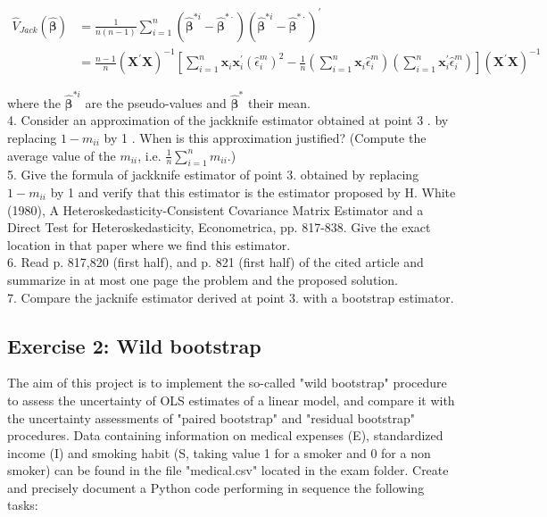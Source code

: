 $$
\begin{aligned}
\hat{V}_{J a c k}(\hat{\boldsymbol{\beta}}) & =\frac{1}{n(n-1)} \sum_{i=1}^{n}\left(\hat{\boldsymbol{\beta}}^{* i}-\hat{\boldsymbol{\beta}}^{* \cdot}\right)\left(\hat{\boldsymbol{\beta}}^{* i}-\hat{\boldsymbol{\beta}}^{* \cdot}\right)^{\prime} \\
& =\frac{n-1}{n}\left(\mathbf{X}^{\prime} \mathbf{X}\right)^{-1}\left[\sum_{i=1}^{n} \mathbf{x}_{i} \mathbf{x}_{i}^{\prime}\left(\hat{\epsilon}_{i}^{m}\right)^{2}-\frac{1}{n}\left(\sum_{i=1}^{n} \mathbf{x}_{i} \hat{\epsilon}_{i}^{m}\right)\left(\sum_{i=1}^{n} \mathbf{x}_{i}^{\prime} \hat{\epsilon}_{i}^{m}\right)\right]\left(\mathbf{X}^{\prime} \mathbf{X}\right)^{-1}
\end{aligned}
$$

where the $\hat{\boldsymbol{\beta}}^{* i}$ are the pseudo-values and $\hat{\boldsymbol{\beta}}^{*}$ their mean.\\
4. Consider an approximation of the jackknife estimator obtained at point 3 . by replacing $1-m_{i i}$ by 1 . When is this approximation justified? (Compute the average value of the $m_{i i}$, i.e. $\frac{1}{n} \sum_{i=1}^{n} m_{i i}$.)\\
5. Give the formula of jackknife estimator of point 3. obtained by replacing $1-m_{i i}$ by 1 and verify that this estimator is the estimator proposed by H. White (1980), A Heteroskedasticity-Consistent Covariance Matrix Estimator and a Direct Test for Heteroskedasticity, Econometrica, pp. 817-838. Give the exact location in that paper where we find this estimator.\\
6. Read p. 817,820 (first half), and p. 821 (first half) of the cited article and summarize in at most one page the problem and the proposed solution.\\
7. Compare the jacknife estimator derived at point 3. with a bootstrap estimator.

\subsection{Exercise 2: Wild bootstrap}
The aim of this project is to implement the so-called "wild bootstrap" procedure to assess the uncertainty of OLS estimates of a linear model, and compare it with the uncertainty assessments of "paired bootstrap" and "residual bootstrap" procedures. Data containing information on medical expenses (E), standardized income (I) and smoking habit (S, taking value 1 for a smoker and 0 for a non smoker) can be found in the file "medical.csv" located in the exam folder. Create and precisely document a Python code performing in sequence the following tasks:


